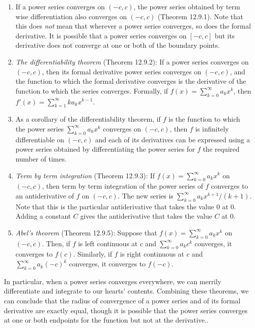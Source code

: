 \documentclass{amsart}
\begin{document}
\begin{enumerate}
\item If a power series converges on $(-c,c)$, the power series
  obtained by term wise differentiation also converges on $(-c,c)$
  (Theorem 12.9.1). Note that this does {\em not} mean that wherever a
  power series converges, so does the formal derivative. It is
  possible that a power series converges on $[-c,c]$ but its
  derivative does not converge at one or both of the boundary points.
\item {\em The differentiability theorem} (Theorem 12.9.2): If a power
  series converges on $(-c,c)$, then its formal derivative power
  series converges on $(-c,c)$, and the function to which the formal
  derivative converges is the derivative of the function to which the
  series converges. Formally, if $f(x) = \sum_{k=0}^\infty a_kx^k$,
  then $f'(x) = \sum_{k=1}^\infty ka_kx^{k-1}$.
\item As a corollary of the differentiability theorem, if $f$ is the
  function to which the power series $\sum_{k=0}^\infty a_kx^k$
  converges on $(-c,c)$, then $f$ is infinitely differentiable on
  $(-c,c)$ and each of its derivatives can be expressed using a power
  series obtained by differentiating the power series for $f$ the
  required number of times.
\item {\em Term by term integration} (Theorem 12.9.3): If $f(x) =
  \sum_{k=0}^\infty a_kx^k$ on $(-c,c)$, then term by term integration
  of the power series of $f$ converges to an antiderivative of $f$ on
  $(-c,c)$. The new series is $\sum_{k=0}^\infty
  a_kx^{k+1}/(k+1)$. Note that this is the particular antiderivative
  that takes the value $0$ at $0$. Adding a constant $C$ gives the
  antiderivative that takes the value $C$ at $0$.
\item {\em Abel's theorem} (Theorem 12.9.5): Suppose that $f(x) =
  \sum_{k=0}^\infty a_kx^k$ on $(-c,c)$. Then, if $f$ is left
  continuous at $c$ and $\sum_{k=0}^\infty a_kc^k$ converges, it
  converges to $f(c)$. Similarly, if $f$ is right continuous at $c$
  and $\sum_{k=0}^\infty a_k(-c)^k$ converges, it converges to $f(-c)$.
\end{enumerate}

In particular, when a power series converges everywhere, we can
merrily differentiate and integrate to our hearts' contents. Combining
these theorems, we can conclude that the radius of convergence of a
power series and of its formal derivative are exactly equal, though it
is possible that the power series converges at one or both endpoints
for the function but not at the derivative..
\end{document}
